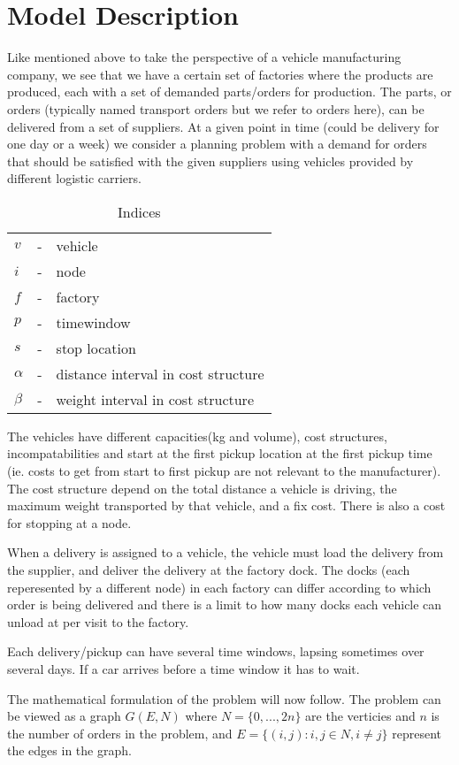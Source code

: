 \documentclass[../main.tex]{subfiles}
\begin{document}
                                                

\chapter{Model Description}
Like mentioned above to take the perspective of a vehicle manufacturing company, we see that we have a certain set of factories where the products are produced, each with a set of demanded parts/orders for production.
The parts, or orders (typically named transport orders but we refer to orders here), can be delivered from a set of suppliers.
At a given point in time (could be delivery for one day or a week) we consider a planning problem with a demand for orders that should be satisfied with the given suppliers using vehicles provided by different logistic carriers.
\linebreak

\begin{table}[h]
\begin{tabular}{l c l }
    $v      $ &-& vehicle     					        \\
    $i      $ &-& node 	        				        \\
    $f      $ &-& factory 		                                \\
    $p      $ &-& timewindow                    		        \\
    $s      $ &-& stop location 				        \\
    $\alpha $ &-& distance interval in cost structure		        \\
    $\beta  $ &-& weight interval in cost structure		        \\
\end{tabular}
    \caption{Indices}
    \label{tab:ind}
\end{table}

The vehicles have different capacities(kg and volume), cost structures, incompatabilities and start at the first pickup location at the first pickup time (ie. costs to get from start to first pickup are not relevant to the manufacturer).
The cost structure depend on the total distance a vehicle is driving, the maximum weight transported by that vehicle, and a fix cost. There is also a cost for stopping at a node. \par
When a delivery is assigned to a vehicle, the vehicle must load the delivery from the supplier, and deliver the delivery at the factory dock.
The docks (each reperesented by a different node) in each factory can differ according to which order is being delivered and there is a limit to how many docks each vehicle can unload at per visit to the factory. \par
Each delivery/pickup can have several time windows, lapsing sometimes over several days. If a car arrives before a time window it has to wait. \par
The mathematical formulation of the problem will now follow. 
The problem can be viewed as a graph $G(E,N)$ where $N=\{0,...,2n\}$ are the verticies and $n$ is the number of orders in the problem, and $E=\{(i,j): i,j \in N, i \neq j\}$ represent the edges in the graph.
\linebreak
\end{document}
